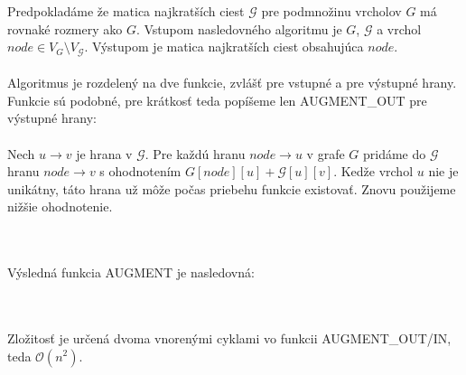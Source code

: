 \documentclass[paper=a4, fontsize=11pt]{scrartcl} %
\numberwithin{equation}{section} %
\numberwithin{figure}{section} %
\numberwithin{table}{section} %
\begin{document}
Predpokladáme že matica najkratších ciest $\mathcal{G}$ pre podmnožinu vrcholov $G$ má rovnaké rozmery ako $G$.  Vstupom nasledovného algoritmu je $G$, $\mathcal{G}$ a vrchol $node \in V_{G} \setminus V_{\mathcal{G}}$. Výstupom je matica najkratších ciest obsahujúca $node$.\\
\ \\
Algoritmus je rozdelený na dve funkcie, zvlášť pre vstupné a pre výstupné hrany. Funkcie sú podobné, pre krátkosť teda popíšeme len AUGMENT\_OUT pre výstupné hrany:\\
\ \\
Nech $u \to v$ je hrana v $\mathcal{G}$. Pre každú hranu $node \to u$ v grafe $G$ pridáme do $\mathcal{G}$ hranu $node \to v$ s ohodnotením $G[node][u] +\mathcal{G}[u][v]$. Kedže vrchol $u$ nie je unikátny, táto hrana už môže počas priebehu funkcie existovať. Znovu použijeme nižšie ohodnotenie.\\
\ \\
\begin{algorithmic}[1]
                        \EndIf
                    \EndIf
                \EndFor
            \EndIf
        \EndFor
        \State {}
    \EndFunction
\end{algorithmic}
\ \\
Výsledná funkcia AUGMENT je nasledovná:\\
\ \\
\begin{algorithmic}[1]
        \State {}
    \EndFunction
\end{algorithmic}
\ \\
Zložitosť je určená dvoma vnorenými cyklami vo funkcii AUGMENT\_OUT/IN, teda $\mathcal{O}(n^2)$.
\end{document}
